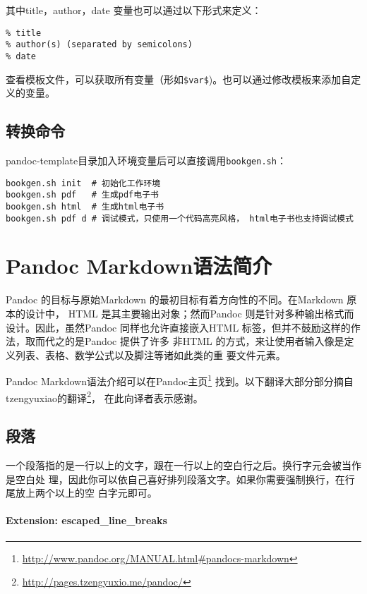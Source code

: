 \documentclass[fancyhdr,bookmark]{ctexbook}
\renewcommand{\href}[2]{#2\footnote{\url{#1}}}
\begin{document}
其中title，author，date 变量也可以通过以下形式来定义：

\begin{lstlisting}
% title
% author(s) (separated by semicolons)
% date
\end{lstlisting}

查看模板文件，可以获取所有变量（形如\lstinline!$var$!)。也可以通过修改模板来添加自定义的变量。

\section{转换命令}\label{ux8f6cux6362ux547dux4ee4}

pandoc-template目录加入环境变量后可以直接调用\lstinline!bookgen.sh!：

\begin{lstlisting}
bookgen.sh init  # 初始化工作环境
bookgen.sh pdf   # 生成pdf电子书
bookgen.sh html  # 生成html电子书
bookgen.sh pdf d # 调试模式，只使用一个代码高亮风格， html电子书也支持调试模式
\end{lstlisting}

\chapter{Pandoc
Markdown语法简介}\label{pandoc-markdownux8bedux6cd5ux7b80ux4ecb}

Pandoc 的目标与原始Markdown 的最初目标有着方向性的不同。在Markdown
原本的设计中， HTML 是其主要输出对象；然而Pandoc
则是针对多种输出格式而设计。因此，虽然Pandoc 同样也允许直接嵌入HTML
标签，但并不鼓励这样的作法，取而代之的是Pandoc 提供了许多 非HTML
的方式，来让使用者输入像是定义列表、表格、数学公式以及脚注等诸如此类的重
要文件元素。

Pandoc
Markdown语法介绍可以在\href{http://www.pandoc.org/MANUAL.html\#pandocs-markdown}{Pandoc主页}
找到。以下翻译大部分部分摘自\href{http://pages.tzengyuxio.me/pandoc/}{tzengyuxiao的翻译}，
在此向译者表示感谢。

\section{段落}\label{ux6bb5ux843d}

一个段落指的是一行以上的文字，跟在一行以上的空白行之后。换行字元会被当作是空白处
理，因此你可以依自己喜好排列段落文字。如果你需要强制换行，在行尾放上两个以上的空
白字元即可。

\subsubsection{Extension:
escaped\_line\_breaks}\label{extension-escaped_line_breaks}
\end{document}
